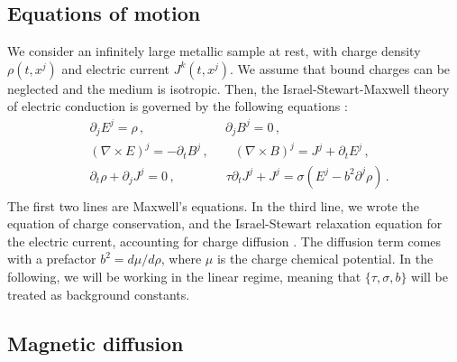 \documentclass[a4paper, amsfonts, amssymb, amsmath, reprint, showkeys, nofootinbib, twoside,notitlepage,onecolumn]{revtex4-1}
\theoremstyle{definition}
\theoremstyle{theorem}
\begin{document}
\vspace{-0.4cm}
\subsection{Equations of motion}
\vspace{-0.3cm}


We consider an infinitely large metallic sample at rest, with charge density $\rho(t,x^j)$ and electric current $J^k(t,x^j)$. We assume that bound charges can be neglected and the medium is isotropic. Then, the Israel-Stewart-Maxwell theory of electric conduction is governed by the following equations \cite{Dash:2022xkz}:
\begin{equation}
\begin{split}
& \partial_j E^j=\rho \, ,  \qquad \qquad \qquad \,\, \partial_j B^j=0 \, , \\
& (\nabla \times E)^j =-\partial_t B^j \, , \qquad (\nabla \times B)^j =J^j +\partial_t E^j \, , \\
& \partial_t \rho +\partial_j J^j =0 \, , \quad \quad \quad \quad \! \tau \partial_t J^j +J^j =\sigma(E^j-b^2 \partial^j \rho) \, . \\
\end{split}
\end{equation}
The first two lines are Maxwell's equations. In the third line, we wrote the equation of charge conservation, and the Israel-Stewart relaxation equation for the electric current, accounting for charge diffusion \cite{GavassinoThermoelectric2025bnx}. The diffusion term comes with a prefactor $b^2=d\mu/d\rho$, where $\mu$ is the charge chemical potential. In the following, we will be working in the linear regime, meaning that $\{\tau,\sigma,b\}$ will be treated as background constants.

\vspace{-0.4cm}
\subsection{Magnetic diffusion}
\vspace{-0.3cm}
\end{document}
